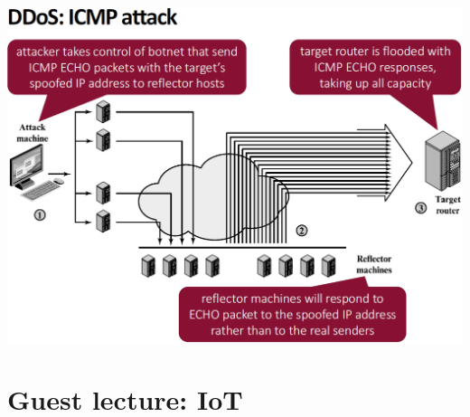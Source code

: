 \documentclass[12pt]{article}
\begin{document}
 \includegraphics[width=0.9\linewidth]{./slides/L8P3DDOSICMP.png}
 
 \section{Guest lecture: IoT}
\end{document}
